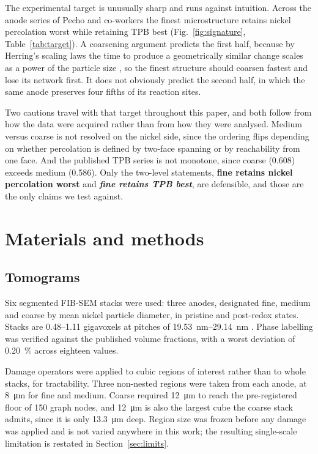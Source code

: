 \documentclass[5p,times,twocolumn]{elsarticle}
\begin{document}
The experimental target is unusually sharp and runs against intuition. Across
the anode series of Pecho and co-workers \cite{pecho2015transport,pecho2015tpb}
the finest microstructure retains nickel percolation worst while
retaining TPB best (Fig.~\ref{fig:signature}, Table~\ref{tab:target}).
A coarsening argument predicts the first half, because by Herring's scaling
laws the
time to produce a geometrically similar change scales as a power of the
particle size \cite{herring1950}, so the finest structure should coarsen
fastest and lose its network first. It does not obviously predict the second
half, in which the same anode preserves four fifths of its reaction sites.

Two cautions travel with that target throughout this paper, and both follow
from how the data were acquired rather than from how they were analysed.
Medium versus coarse is not resolved on the nickel side, since the ordering
flips
depending on whether percolation is defined by two-face spanning or by
reachability from one face. And the published TPB series is not monotone,
since coarse (0.608) exceeds medium (0.586). Only the two-level statements,
\textbf{fine retains nickel percolation worst} and \emph{\textbf{fine retains TPB best}}, are defensible, and those are the only claims we test against.

\section{Materials and methods}

\subsection{Tomograms}

Six segmented FIB-SEM stacks were used: three anodes, designated fine, medium
and coarse by mean nickel particle diameter, in pristine and post-redox states.
Stacks are \numrange{0.48}{1.11} gigavoxels at pitches of
\SIrange{19.53}{29.14}{\nano\metre} \cite{pecho2015transport,pecho2015tpb}.
Phase labelling was verified against the published volume fractions, with a
worst deviation of \SI{0.20}{\percent} across eighteen values.

Damage operators were applied to cubic regions of interest rather than to
whole stacks, for tractability. Three non-nested regions were taken from each
anode, at \SI{8}{\micro\metre} for fine and medium. Coarse required
\SI{12}{\micro\metre} to reach the pre-registered floor of 150 graph nodes,
and \SI{12}{\micro\metre} is also the largest cube the coarse stack admits,
since it is only \SI{13.3}{\micro\metre} deep. Region size was frozen before
any damage was applied and is not varied anywhere in this work; the resulting
single-scale limitation is restated in Section~\ref{sec:limits}.
\end{document}
